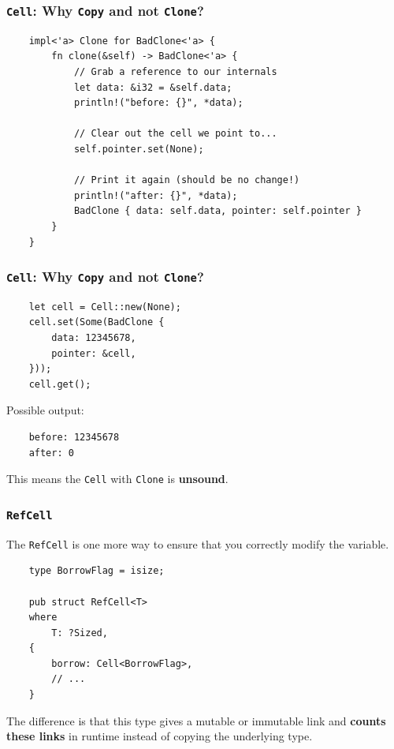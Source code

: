 \documentclass[aspectratio=1610,t]{beamer}
\begin{document}

\begin{frame}[fragile]
\frametitle{\texttt{Cell}: Why \texttt{Copy} and not \texttt{Clone}?}
\begin{verbatim}
    impl<'a> Clone for BadClone<'a> {
        fn clone(&self) -> BadClone<'a> {
            // Grab a reference to our internals
            let data: &i32 = &self.data;
            println!("before: {}", *data);
            
            // Сlear out the cell we point to...
            self.pointer.set(None); 
            
            // Print it again (should be no change!)
            println!("after: {}", *data);
            BadClone { data: self.data, pointer: self.pointer }
        }
    }
\end{verbatim}
\end{frame}


\begin{frame}[fragile]
\frametitle{\texttt{Cell}: Why \texttt{Copy} and not \texttt{Clone}?}
\begin{verbatim}
    let cell = Cell::new(None);
    cell.set(Some(BadClone {
        data: 12345678,
        pointer: &cell,
    }));
    cell.get();
\end{verbatim}

Possible output:

\begin{verbatim}
    before: 12345678
    after: 0
\end{verbatim}

This means the \texttt{Cell} with \texttt{Clone} is \textbf{unsound}.
\end{frame}


\begin{frame}[fragile]
\frametitle{\texttt{RefCell}}
The \texttt{RefCell} is one more way to ensure that you correctly modify the variable.

\begin{verbatim}
    type BorrowFlag = isize;

    pub struct RefCell<T> 
    where
        T: ?Sized, 
    {
        borrow: Cell<BorrowFlag>,
        // ... 
    }
\end{verbatim}

The difference is that this type gives a mutable or immutable link and \textbf{counts these links} in runtime instead of copying the underlying type.
\end{frame}
\end{document}
